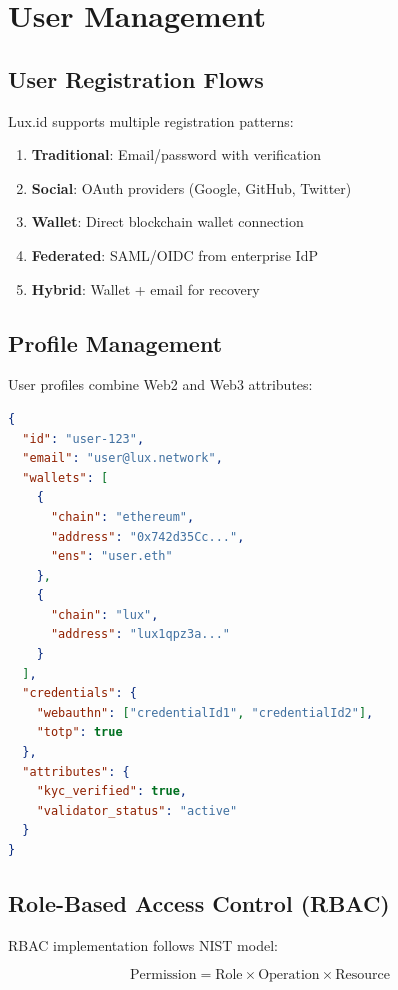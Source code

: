 \section{User Management}


\subsection{User Registration Flows}

Lux.id supports multiple registration patterns:

\begin{enumerate}
    \item \textbf{Traditional}: Email/password with verification
    \item \textbf{Social}: OAuth providers (Google, GitHub, Twitter)
    \item \textbf{Wallet}: Direct blockchain wallet connection
    \item \textbf{Federated}: SAML/OIDC from enterprise IdP
    \item \textbf{Hybrid}: Wallet + email for recovery
\end{enumerate}

\subsection{Profile Management}

User profiles combine Web2 and Web3 attributes:

\begin{lstlisting}[language=json]
{
  "id": "user-123",
  "email": "user@lux.network",
  "wallets": [
    {
      "chain": "ethereum",
      "address": "0x742d35Cc...",
      "ens": "user.eth"
    },
    {
      "chain": "lux",
      "address": "lux1qpz3a..."
    }
  ],
  "credentials": {
    "webauthn": ["credentialId1", "credentialId2"],
    "totp": true
  },
  "attributes": {
    "kyc_verified": true,
    "validator_status": "active"
  }
}
\end{lstlisting}

\subsection{Role-Based Access Control (RBAC)}

RBAC implementation follows NIST model:

\begin{equation}
    \text{Permission} = \text{Role} \times \text{Operation} \times \text{Resource}
\end{equation}

